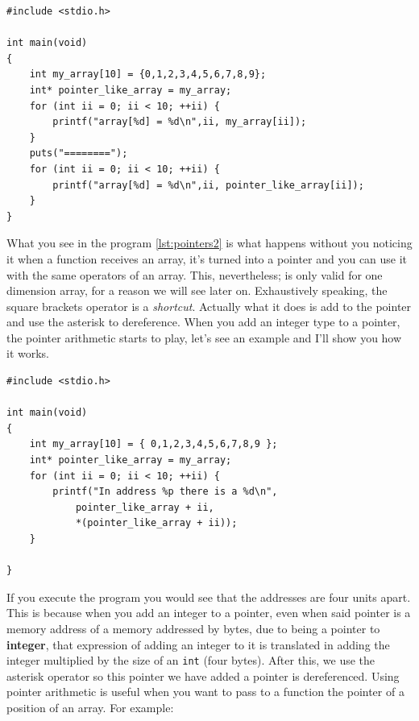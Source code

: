 \documentclass[a4paper]{article}
\begin{document}
\noindent
\begin{minipage}[H]{\linewidth}
\mbox{}
\begin{lstlisting}[style=C, label={lst:pointers2},
caption={Arrays como punteros}]
#include <stdio.h>

int main(void)
{
    int my_array[10] = {0,1,2,3,4,5,6,7,8,9};
    int* pointer_like_array = my_array;
    for (int ii = 0; ii < 10; ++ii) {
        printf("array[%d] = %d\n",ii, my_array[ii]);
    }
    puts("========");
    for (int ii = 0; ii < 10; ++ii) {
        printf("array[%d] = %d\n",ii, pointer_like_array[ii]);
    }
}
\end{lstlisting}
\end{minipage}

What you see in the program \ref{lst:pointers2} is what happens without
you noticing it when a function receives an array, it's turned into a pointer
and you can use it with the same operators of an array. This, nevertheless; is
only valid for one dimension array, for a reason we will see later on.
Exhaustively speaking, the square brackets operator is a \emph{shortcut}. Actually
what it does is add to the pointer and use the asterisk to dereference. When you
add an integer type to a pointer, the pointer arithmetic starts to play, let's
see an example and I'll show you how it works.

\noindent
\begin{minipage}[H]{\linewidth}
\mbox{}
\begin{lstlisting}[style=C, label={lst:pointers3},
caption={Aritmética de punteros}]
#include <stdio.h>

int main(void)
{
    int my_array[10] = { 0,1,2,3,4,5,6,7,8,9 };
    int* pointer_like_array = my_array;
    for (int ii = 0; ii < 10; ++ii) {
        printf("In address %p there is a %d\n",
            pointer_like_array + ii,
            *(pointer_like_array + ii));
    }

}
\end{lstlisting}
\end{minipage}

If you execute the program you would see that the addresses are four units
apart. This is because when you add an integer to a pointer, even when said
pointer is a memory address of a memory addressed by bytes, due to being a
pointer to \textbf{integer}, that expression of adding an integer to it is
translated in adding the integer multiplied by the size of an \verb!int!
(four bytes). After this, we use the asterisk operator so this pointer we have
added a pointer is dereferenced. Using pointer arithmetic is useful when
you want to pass to a function the pointer of a position of an array. For
example:
\end{document}
